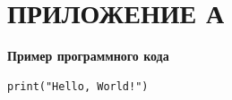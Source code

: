 \newpage
\section*{ПРИЛОЖЕНИЕ А}
\vspace{-\baselineskip}
{\centering\textbf{Пример программного кода}\par}

\begin{lstlisting}
print("Hello, World!")
\end{lstlisting}

